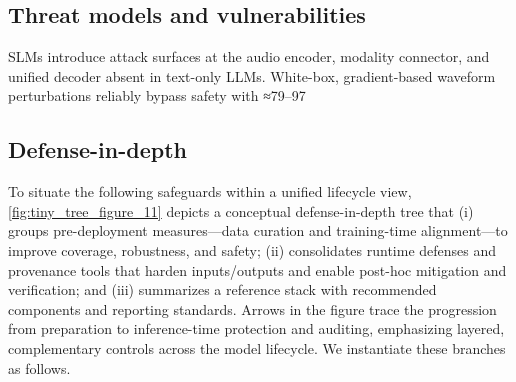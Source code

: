 \subsection{Threat models and vulnerabilities} \label{subsec:Threat models and vulnerabilities}
SLMs introduce attack surfaces at the audio encoder, modality connector, and unified decoder absent in text-only LLMs. White-box, gradient-based waveform perturbations reliably bypass safety with ≈79–97%

\subsection{Defense-in-depth} \label{subsec:Defense-in-depth}
To situate the following safeguards within a unified lifecycle view, \autoref{fig:tiny_tree_figure_11} depicts a conceptual defense-in-depth tree that (i) groups pre-deployment measures—data curation and training-time alignment—to improve coverage, robustness, and safety; (ii) consolidates runtime defenses and provenance tools that harden inputs/outputs and enable post-hoc mitigation and verification; and (iii) summarizes a reference stack with recommended components and reporting standards. Arrows in the figure trace the progression from preparation to inference-time protection and auditing, emphasizing layered, complementary controls across the model lifecycle. We instantiate these branches as follows.

